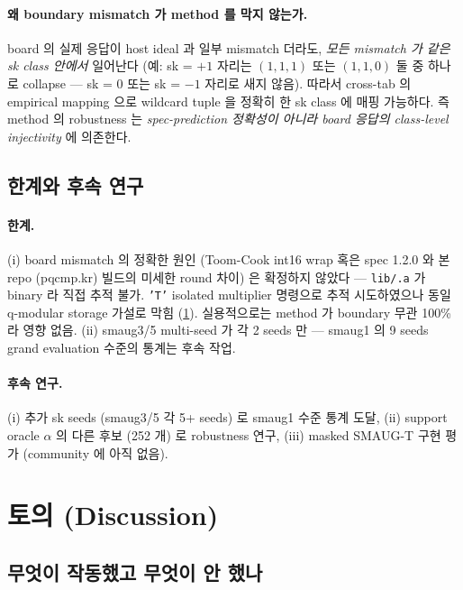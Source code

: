 \documentclass[11pt]{article}
\theoremstyle{plain}
\theoremstyle{definition}
\theoremstyle{remark}
\begin{document}
\paragraph{왜 boundary mismatch 가 method 를 막지 않는가.} board 의 실제
응답이 host ideal 과 일부 mismatch 더라도, \emph{모든 mismatch 가 같은 sk class
안에서} 일어난다 (예: sk = $+1$ 자리는 $(1,1,1)$ 또는 $(1,1,0)$ 둘 중 하나로
collapse — sk = 0 또는 sk = $-1$ 자리로 새지 않음). 따라서 cross-tab 의
empirical mapping 으로 wildcard tuple 을 정확히 한 sk class 에 매핑 가능하다.
즉 method 의 robustness 는 \emph{spec-prediction 정확성이 아니라 board 응답의
class-level injectivity} 에 의존한다.

\subsection{한계와 후속 연구}
\label{sec:ext-limit}

\paragraph{한계.} (i) board mismatch 의 정확한 원인 (Toom-Cook int16 wrap
혹은 spec 1.2.0 와 본 repo (pqcmp.kr) 빌드의 미세한 round 차이) 은 확정하지
않았다 — \texttt{lib/.a} 가 binary 라 직접 추적 불가. \texttt{'T'} isolated
multiplier 명령으로 추적 시도하였으나 동일 q-modular storage 가설로 막힘
(\cref{sec:discussion}). 실용적으로는 method 가 boundary 무관 100\% 라 영향 없음.
(ii) smaug3/5 multi-seed 가 각 2 seeds 만 — smaug1 의 9 seeds grand
evaluation 수준의 통계는 후속 작업.

\paragraph{후속 연구.} (i) 추가 sk seeds (smaug3/5 각 5+ seeds) 로 smaug1
수준 통계 도달, (ii) support oracle $\alpha$ 의 다른 후보 (252 개) 로
robustness 연구, (iii) masked SMAUG-T 구현 평가 (community 에 아직 없음).

\section{토의 (Discussion)}
\label{sec:discussion}

\subsection{무엇이 작동했고 무엇이 안 했나}
\end{document}
